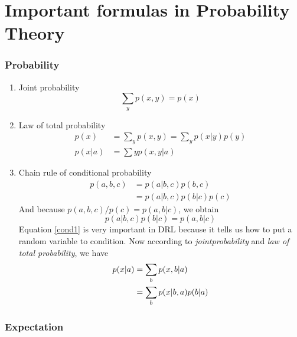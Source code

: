 \part{Important formulas in Probability Theory}

\section{Probability}

\begin{enumerate}

	\item
	      Joint probability
	      \begin{equation*}
		      \sum_{y}p(x,y)=p(x)
	      \end{equation*}
	\item
	      Law of total probability
	      \begin{align*}
		      p(x)   & = \sum_{y}p(x,y) = \sum_{y}p(x|y)p(y) \\
		      p(x|a) & = \sum{y}p(x,y|a)
	      \end{align*}
	\item
	      Chain rule of conditional probability
	      \begin{align*}
		      p(a,b,c) & = p(a|b,c)p(b,c)     \\
		               & = p(a|b,c)p(b|c)p(c)
	      \end{align*}
	      And because $p(a,b,c)/p(c)=p(a,b|c)$, we obtain
	      \begin{equation}
		      \label{cond1}
		      p(a|b,c)p(b|c) = p(a,b|c)
	      \end{equation}
	      Equation \ref{cond1} is very important in DRL because it tells us how to put a random variable to condition. Now
	      according to \emph{jointprobability} and \emph{law of total probability}, we have
	      \begin{align}
		      p(x|a) & = \sum_{b}p(x,b|a) \notag \\
		             & = \sum_{b}p(x|b,a)p(b|a)
	      \end{align}
\end{enumerate}

\section{Expectation}

